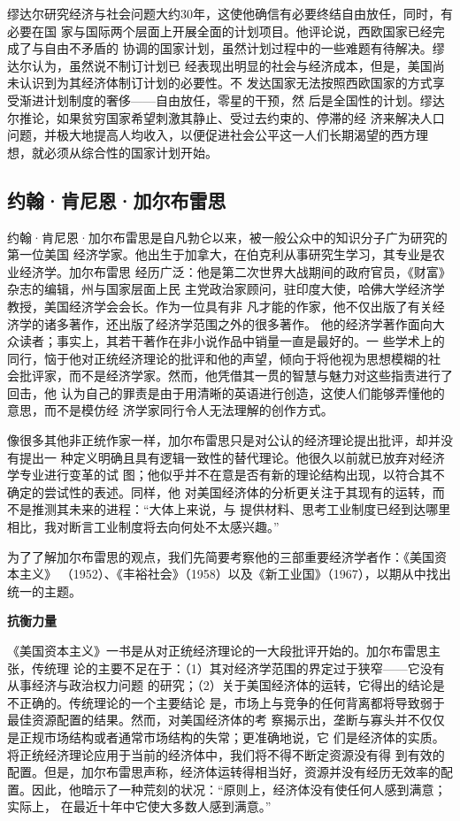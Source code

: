 缪达尔研究经济与社会问题大约30年，这使他确信有必要终结自由放任，同时，有必要在国
家与国际两个层面上开展全面的计划项目。他评论说，西欧国家已经完成了与自由不矛盾的
协调的国家计划，虽然计划过程中的一些难题有待解决。缪达尔认为，虽然说不制订计划已
经表现出明显的社会与经济成本，但是，美国尚未认识到为其经济体制订计划的必要性。不
发达国家无法按照西欧国家的方式享受渐进计划制度的奢侈——自由放任，零星的干预，然
后是全国性的计划。缪达尔推论，如果贫穷国家希望刺激其静止、受过去约束的、停滞的经
济来解决人口问题，并极大地提高人均收入，以便促进社会公平这一人们长期渴望的西方理
想，就必须从综合性的国家计划开始。

\subsection{约翰·肯尼恩·加尔布雷思}

约翰·肯尼恩·加尔布雷思是自凡勃仑以来，被一般公众中的知识分子广为研究的第一位美国
经济学家。他出生于加拿大，在伯克利从事研究生学习，其专业是农业经济学。加尔布雷思
经历广泛：他是第二次世界大战期间的政府官员，《财富》杂志的编辑，州与国家层面上民
主党政治家顾问，驻印度大使，哈佛大学经济学教授，美国经济学会会长。作为一位具有非
凡才能的作家，他不仅出版了有关经济学的诸多著作，还出版了经济学范围之外的很多著作。
他的经济学著作面向大众读者；事实上，其若干著作在非小说作品中销量一直是最好的。一
些学术上的同行，恼于他对正统经济理论的批评和他的声望，倾向于将他视为思想模糊的社
会批评家，而不是经济学家。然而，他凭借其一贯的智慧与魅力对这些指责进行了回击，他
认为自己的罪责是由于用清晰的英语进行创造，这使人们能够弄懂他的意思，而不是模仿经
济学家同行令人无法理解的创作方式。

像很多其他非正统作家一样，加尔布雷思只是对公认的经济理论提出批评，却并没有提出一
种定义明确且具有逻辑一致性的替代理论。他很久以前就已放弃对经济学专业进行变革的试
图；他似乎并不在意是否有新的理论结构出现，以符合其不确定的尝试性的表述。同样，他
对美国经济体的分析更关注于其现有的运转，而不是推测其未来的进程：“大体上来说，与
提供材料、思考工业制度已经到达哪里相比，我对断言工业制度将去向何处不太感兴趣。”

为了了解加尔布雷思的观点，我们先简要考察他的三部重要经济学者作：《美国资本主义》
（1952）、《丰裕社会》（1958）以及《新工业国》（1967），以期从中找出统一的主题。

\textbf{\sffamily 抗衡力量}

《美国资本主义》一书是从对正统经济理论的一大段批评开始的。加尔布雷思主张，传统理
论的主要不足在于：（1）其对经济学范围的界定过于狭窄——它没有从事经济与政治权力问题
的研究；（2）关于美国经济体的运转，它得出的结论是不正确的。传统理论的一个主要结论
是，市场上与竞争的任何背离都将导致弱于最佳资源配置的结果。然而，对美国经济体的考
察揭示出，垄断与寡头并不仅仅是正规市场结构或者通常市场结构的失常；更准确地说，它
们是经济体的实质。将正统经济理论应用于当前的经济体中，我们将不得不断定资源没有得
到有效的配置。但是，加尔布雷思声称，经济体运转得相当好，资源并没有经历无效率的配
置。因此，他暗示了一种荒刻的状况：“原则上，经济体没有使任何人感到满意；实际上，
在最近十年中它使大多数人感到满意。”

